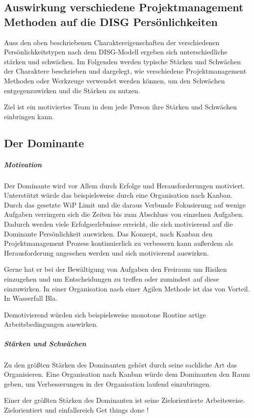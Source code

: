 \documentclass[twocolumn,10pt]{asme2ej}
\begin{document}
%

\subsection{Auswirkung verschiedene Projektmanagement Methoden auf die DISG Persönlichkeiten}
Auss den oben beschriebenen Charaktereigenschaften der verschiedenen Persönlichkeitstypen nach dem DISG-Modell ergeben sich unterschiedliche stärken und schwächen. Im Folgenden werden typische Stärken und Schwächen der Charaktere beschrieben und dargelegt, wie verschiedene Projektmanagement Methoden oder Werkzeuge verwendet werden können, um den Schwächen entgegenzuwirken und die Stärken zu nutzen.

Ziel ist ein motiviertes Team in dem jede Person ihre Stärken und Schwächen einbringen kann.

\subsection{Der Dominante}
\subparagraph{Motivation}
Der Dominante  wird vor Allem durch Erfolge und Herausforderungen motiviert. Unterstützt würde das beispielsweise durch eine Organisation nach Kanban. Durch das gesetzte WiP Limit und die daraus Verbunde Fokusierung auf wenige Aufgaben verringern sich die Zeiten bis zum Abschluss von einzelnen Aufgaben. Dadurch werden viele Erfolgserlebnisse erreicht, die sich motivierend auf die Dominante Persönlichkeit auswirken. Das Konzept, nach Kanban den Projektmanagement Prozess kontinuierlich zu verbessern kann außerdem als Herausforderung angesehen werden und sich motivierend auswirken.

Gerne hat er bei der Bewältigung von Aufgaben den Freiraum um Risiken einzugehen und um Entscheidungen zu treffen oder zumindest auf diese einzuwirken. In einer Organisation nach einer Agilen Methode ist das von Vorteil. In Wasserfall Bla.

Demotivierend würden sich beispielsweise monotone Routine artige Arbeitsbedingungen auswirken.

\subparagraph{Stärken und Schwächen}

Zu den größten Stärken des Dominanten gehört durch seine sachliche Art das Organisieren. Eine Organisation nach Kanban würde dem Dominanten den Raum geben, um Verbesserungen in der Organisation laufend einzubringen. 

Einer der größten Stärken des Dominanten ist seine Zielorientierte Arbeitsweise. 
Zielorientiert und einfallsreich Get things done !
\end{document}
